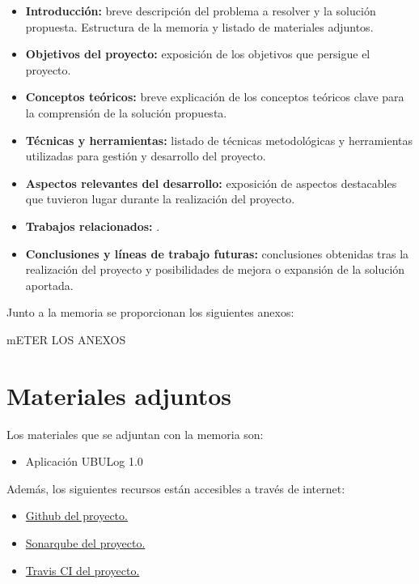 \begin{itemize}
	\tightlist
	\item
	\textbf{Introducción:} breve descripción del problema a resolver y la
	solución propuesta. Estructura de la memoria y listado de materiales
	adjuntos.
	\item
	\textbf{Objetivos del proyecto:} exposición de los objetivos que
	persigue el proyecto.
	\item
	\textbf{Conceptos teóricos:} breve explicación de los conceptos
	teóricos clave para la comprensión de la solución propuesta.
	\item
	\textbf{Técnicas y herramientas:} listado de técnicas metodológicas y
	herramientas utilizadas para gestión y desarrollo del proyecto.
	\item
	\textbf{Aspectos relevantes del desarrollo:} exposición de aspectos
	destacables que tuvieron lugar durante la realización del proyecto.
	\item
	\textbf{Trabajos relacionados:} .
	\item
	\textbf{Conclusiones y líneas de trabajo futuras:} conclusiones
	obtenidas tras la realización del proyecto y posibilidades de mejora o
	expansión de la solución aportada.
\end{itemize}

Junto a la memoria se proporcionan los siguientes anexos:

mETER LOS ANEXOS

\section{Materiales adjuntos}\label{materiales-adjuntos}

Los materiales que se adjuntan con la memoria son: 

\begin{itemize}
	\tightlist
	\item
	Aplicación UBULog 1.0
\end{itemize}

Además, los siguientes recursos están accesibles a través de internet:

\begin{itemize}
	\tightlist
	\item
	\href{https://github.com/trona85/GII-17.1B-UBULog-1.0}{Github del proyecto.}
	\item
	\href{https://sonarcloud.io/dashboard?id=GII-17.1B-UBULog-1.0}{Sonarqube del proyecto.}
	\item
	\href{https://travis-ci.org/trona85/GII-17.1B-UBULog-1.0/}{Travis CI del proyecto.}
	
\end{itemize}



